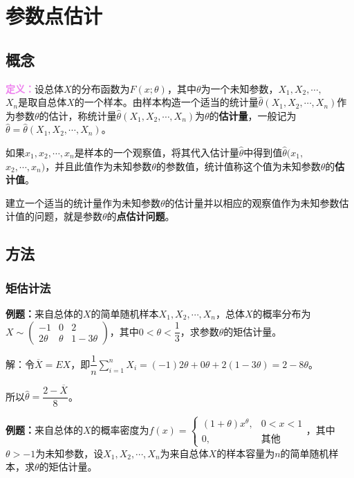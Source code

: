 \documentclass[UTF8, 12pt]{ctexart}
\begin{document}
\section{参数点估计}

\subsection{概念}

\textcolor{violet}{\textbf{定义：}}设总体$X$的分布函数为$F(x;\theta)$，其中$\theta$为一个未知参数，$X_1,X_2,\cdots,$\\$X_n$是取自总体$X$的一个样本。由样本构造一个适当的统计量$\hat{\theta}(X_1,X_2,\cdots,X_n)$作为参数$\theta$的估计，称统计量$\hat{\theta}(X_1,X_2,\cdots,X_n)$为$\theta$的\textbf{估计量}，一般记为$\hat{\theta}=\hat{\theta}(X_1,X_2,\cdots,X_n)$。

如果$x_1,x_2,\cdots,x_n$是样本的一个观察值，将其代入估计量$\hat{\theta}$中得到值$\hat{\theta}(x_1,$\\$x_2,\cdots,x_n)$，并且此值作为未知参数$\theta$的参数值，统计值称这个值为未知参数$\theta$的\textbf{估计值}。

建立一个适当的统计量作为未知参数$\theta$的估计量并以相应的观察值作为未知参数估计值的问题，就是参数$\theta$的\textbf{点估计问题}。

\subsection{方法}

\subsubsection{矩估计法}

\textbf{例题：}来自总体的$X$的简单随机样本$X_1,X_2,\cdots,X_n$，总体$X$的概率分布为$X\sim\left(\begin{array}{ccc}
    -1 & 0 & 2 \\
    2\theta & \theta & 1-3\theta
\end{array}\right)$，其中$0<\theta<\dfrac{1}{3}$，求参数$\theta$的矩估计量。

解：令$\overline{X}=EX$，即$\dfrac{1}{n}\sum\limits_{i=1}^nX_i=(-1)2\theta+0\theta+2(1-3\theta)=2-8\theta$。

所以$\hat{\theta}=\dfrac{2-\overline{X}}{8}$。

\textbf{例题：}来自总体的$X$的概率密度为$f(x)=\left\{\begin{array}{ll}
    (1+\theta)x^\theta, & 0<x<1 \\
    0, & \text{其他}
\end{array}\right.$，其中$\theta>-1$为未知参数，设$X_1,X_2,\cdots,X_n$为来自总体$X$的样本容量为$n$的简单随机样本，求$\theta$的矩估计量。
\end{document}
